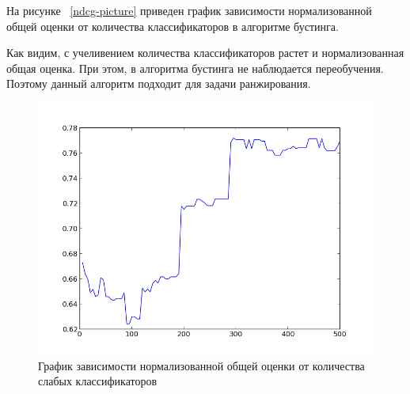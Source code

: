 На рисунке ~\ref{ndcg-picture} приведен график зависимости нормализованной общей оценки от количества классификаторов в алгоритме бустинга. 

Как видим, с учеливением количества классификаторов растет и нормализованная общая оценка. При этом, в алгоритма бустинга не наблюдается переобучения. Поэтому данный алгоритм подходит для задачи ранжирования.

\begin{figure}[h]
  \centering
  \includegraphics[width=1.0\textwidth]{images/ndcg_result1.png}
  \caption{График зависимости нормализованной общей оценки от количества слабых классификаторов\label{ndcg_result1}}
\end{figure}

